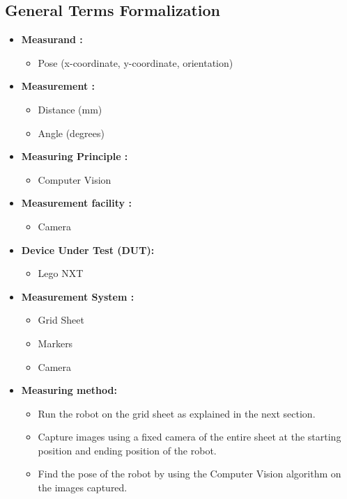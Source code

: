 \documentclass[10pt,a4paper]{article}
\begin{document}
\subsection{General Terms Formalization}


	\begin{itemize}
		\item	
		\textbf{Measurand :}
		\begin{itemize}
			\item
			Pose (x-coordinate, y-coordinate, orientation)
		\end{itemize}
		
		\item
		\textbf{Measurement :}
		\begin{itemize}
			\item
			Distance (mm)
			\item
			Angle (degrees)
		\end{itemize}
		\item
		\textbf{Measuring Principle :}
		\begin{itemize}
			\item
			Computer Vision
		\end{itemize} 
		\item
		\textbf{Measurement facility :}
		\begin{itemize}
			\item
			Camera
		\end{itemize} 
		\item
		\textbf{Device Under Test (DUT):}
		\begin{itemize}
			\item
			Lego NXT
		\end{itemize} 
		\item
		\textbf{Measurement System :}
		\begin{itemize}
			\item
			Grid Sheet
			\item
			Markers
			\item
			Camera
		\end{itemize}
		\item
		\textbf{Measuring method: }
		\begin{itemize}
			\item
			Run the robot on the grid sheet as explained in the next section.
			\item
			Capture images using a fixed camera of the entire sheet at the starting position and ending position of the robot.
			\item
			Find the pose of the robot by using the Computer Vision algorithm on the images captured.
		\end{itemize}
\end{itemize}
\end{document}
